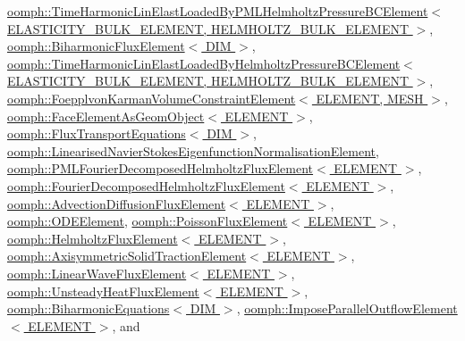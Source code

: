 \hyperlink{classoomph_1_1TimeHarmonicLinElastLoadedByPMLHelmholtzPressureBCElement_aec08514d7dbb65dc5c05af3131828daa}{oomph\+::\+Time\+Harmonic\+Lin\+Elast\+Loaded\+By\+P\+M\+L\+Helmholtz\+Pressure\+B\+C\+Element$<$ E\+L\+A\+S\+T\+I\+C\+I\+T\+Y\+\_\+\+B\+U\+L\+K\+\_\+\+E\+L\+E\+M\+E\+N\+T, H\+E\+L\+M\+H\+O\+L\+T\+Z\+\_\+\+B\+U\+L\+K\+\_\+\+E\+L\+E\+M\+E\+N\+T $>$}, \hyperlink{classoomph_1_1BiharmonicFluxElement_a2d9f3025aa3d9e941a95e2d2ca7f86ce}{oomph\+::\+Biharmonic\+Flux\+Element$<$ D\+I\+M $>$}, \hyperlink{classoomph_1_1TimeHarmonicLinElastLoadedByHelmholtzPressureBCElement_a151fa0b3aa8df4a582d62d82ae42f40e}{oomph\+::\+Time\+Harmonic\+Lin\+Elast\+Loaded\+By\+Helmholtz\+Pressure\+B\+C\+Element$<$ E\+L\+A\+S\+T\+I\+C\+I\+T\+Y\+\_\+\+B\+U\+L\+K\+\_\+\+E\+L\+E\+M\+E\+N\+T, H\+E\+L\+M\+H\+O\+L\+T\+Z\+\_\+\+B\+U\+L\+K\+\_\+\+E\+L\+E\+M\+E\+N\+T $>$}, \hyperlink{classoomph_1_1FoepplvonKarmanVolumeConstraintElement_a3763adc00373350071bef1dea329f94d}{oomph\+::\+Foepplvon\+Karman\+Volume\+Constraint\+Element$<$ E\+L\+E\+M\+E\+N\+T, M\+E\+S\+H $>$}, \hyperlink{classoomph_1_1FaceElementAsGeomObject_a2835ee6ef417ec603c39a1f0f4e356f0}{oomph\+::\+Face\+Element\+As\+Geom\+Object$<$ E\+L\+E\+M\+E\+N\+T $>$}, \hyperlink{classoomph_1_1FluxTransportEquations_a8557a64caa8d9e0b4a152664718d26ab}{oomph\+::\+Flux\+Transport\+Equations$<$ D\+I\+M $>$}, \hyperlink{classoomph_1_1LinearisedNavierStokesEigenfunctionNormalisationElement_a6493569eee1886773a37e5d2641a981c}{oomph\+::\+Linearised\+Navier\+Stokes\+Eigenfunction\+Normalisation\+Element}, \hyperlink{classoomph_1_1PMLFourierDecomposedHelmholtzFluxElement_aa24365f7454ab68b0c1b989cc34bd34b}{oomph\+::\+P\+M\+L\+Fourier\+Decomposed\+Helmholtz\+Flux\+Element$<$ E\+L\+E\+M\+E\+N\+T $>$}, \hyperlink{classoomph_1_1FourierDecomposedHelmholtzFluxElement_afca29e11428579eb58e4bca7f97b0151}{oomph\+::\+Fourier\+Decomposed\+Helmholtz\+Flux\+Element$<$ E\+L\+E\+M\+E\+N\+T $>$}, \hyperlink{classoomph_1_1AdvectionDiffusionFluxElement_a5c8e409a31f90858e556fe359b996b9d}{oomph\+::\+Advection\+Diffusion\+Flux\+Element$<$ E\+L\+E\+M\+E\+N\+T $>$}, \hyperlink{classoomph_1_1ODEElement_a4db1a9984200b201e7aae566afd0cfc6}{oomph\+::\+O\+D\+E\+Element}, \hyperlink{classoomph_1_1PoissonFluxElement_a7be7daf3b3b3ba50a216d40d1d8016f5}{oomph\+::\+Poisson\+Flux\+Element$<$ E\+L\+E\+M\+E\+N\+T $>$}, \hyperlink{classoomph_1_1HelmholtzFluxElement_ac388e1c565715ffc9953fc548def1bf5}{oomph\+::\+Helmholtz\+Flux\+Element$<$ E\+L\+E\+M\+E\+N\+T $>$}, \hyperlink{classoomph_1_1AxisymmetricSolidTractionElement_a49de689d7dc2efecd8bbdbd6673c1fb8}{oomph\+::\+Axisymmetric\+Solid\+Traction\+Element$<$ E\+L\+E\+M\+E\+N\+T $>$}, \hyperlink{classoomph_1_1LinearWaveFluxElement_a76f1a46c72f1ba9c18109416967a568f}{oomph\+::\+Linear\+Wave\+Flux\+Element$<$ E\+L\+E\+M\+E\+N\+T $>$}, \hyperlink{classoomph_1_1UnsteadyHeatFluxElement_af14223df9a18aea9f30d96d918a80aeb}{oomph\+::\+Unsteady\+Heat\+Flux\+Element$<$ E\+L\+E\+M\+E\+N\+T $>$}, \hyperlink{classoomph_1_1BiharmonicEquations_ab96faece91161d22770aba9c3e6747f1}{oomph\+::\+Biharmonic\+Equations$<$ D\+I\+M $>$}, \hyperlink{classoomph_1_1ImposeParallelOutflowElement_aa299d5f5aa5184db817b4219665c77ed}{oomph\+::\+Impose\+Parallel\+Outflow\+Element$<$ E\+L\+E\+M\+E\+N\+T $>$}, and 